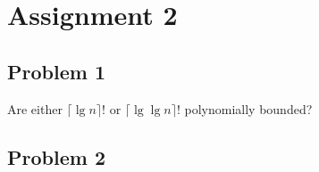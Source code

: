 \chapter{Assignment 2}

\section{Problem 1}
Are either $\lceil \lg n \rceil!$ or $\lceil \lg \lg n \rceil!$ polynomially bounded?
\section{Problem 2}
